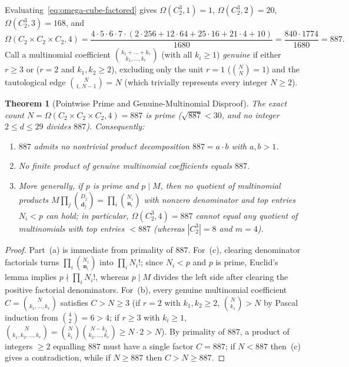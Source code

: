 \documentclass[11pt,a4paper]{article}
\newtheorem{theorem}{Theorem}[section]
\theoremstyle{definition}
\begin{document}
Evaluating~\eqref{eq:omega-cube-factored} gives $\Omega(C_2^3, 1) = 1$, $\Omega(C_2^3, 2) = 20$,
$\Omega(C_2^3, 3) = 168$, and
\[
  \Omega(C_2 \times C_2 \times C_2, 4)
  = \frac{4 \cdot 5 \cdot 6 \cdot 7 \cdot (2\cdot 256 + 12\cdot 64 + 25\cdot 16 + 21\cdot 4 + 10)}{1680}
  = \frac{840 \cdot 1774}{1680} = 887.
\]
Call a multinomial coefficient $\binom{k_1 + \dots + k_r}{k_1, \dots, k_r}$ (with all $k_i \ge 1$)
\emph{genuine} if either $r \ge 3$ or ($r = 2$ and $k_1, k_2 \ge 2$), excluding only the unit $r=1$
($\binom{N}{N} = 1$) and the tautological edge $\binom{N}{1, N-1} = N$ (which trivially represents
every integer $N \ge 2$).

\begin{theorem}[Pointwise Prime and Genuine-Multinomial Disproof]\label{thm:pointwise-disproof}
The exact count $N = \Omega(C_2 \times C_2 \times C_2, 4) = 887$ is prime ($\sqrt{887} < 30$, and no
integer $2 \le d \le 29$ divides $887$). Consequently:
\begin{enumerate}
  \item[(a)] $887$ admits no nontrivial product decomposition $887 = a \cdot b$ with $a, b > 1$.
  \item[(b)] No finite product of genuine multinomial coefficients equals $887$.
  \item[(c)] More generally, if $p$ is prime and $p \mid M$, then no quotient of multinomial products
        $M \prod_j \binom{D_j}{\mathbf{d}_j} = \prod_i \binom{N_i}{\mathbf{n}_i}$ with nonzero
        denominator and top entries $N_i < p$ can hold; in particular, $\Omega(C_2^3, 4) = 887$
        cannot equal any quotient of multinomials with top entries $< 887$ (whereas $|C_2^3| = 8$
        and $m = 4$).
\end{enumerate}
\end{theorem}

\begin{proof}
Part~(a) is immediate from primality of $887$. For~(c), clearing denominator factorials turns
$\prod_i \binom{N_i}{\mathbf{n}_i}$ into $\prod_i N_i!$; since $N_i < p$ and $p$ is prime, Euclid's
lemma implies $p \nmid \prod_i N_i!$, whereas $p \mid M$ divides the left side after clearing the
positive factorial denominators. For~(b), every genuine multinomial coefficient $C =
\binom{N}{k_1,\dots,k_r}$ satisfies $C > N \ge 3$ (if $r = 2$ with $k_1, k_2 \ge 2$, $\binom{N}{k_1}
> N$ by Pascal induction from $\binom{4}{2} = 6 > 4$; if $r \ge 3$ with $k_i \ge 1$,
$\binom{N}{k_1,k_2,\dots,k_r} = \binom{N}{k_1}\binom{N-k_1}{k_2,\dots,k_r} \ge N \cdot 2 > N$). By
primality of $887$, a product of integers $\ge 2$ equalling $887$ must have a single factor $C =
887$; if $N < 887$ then~(c) gives a contradiction, while if $N \ge 887$ then $C > N \ge 887$.
\end{proof}
\end{document}
